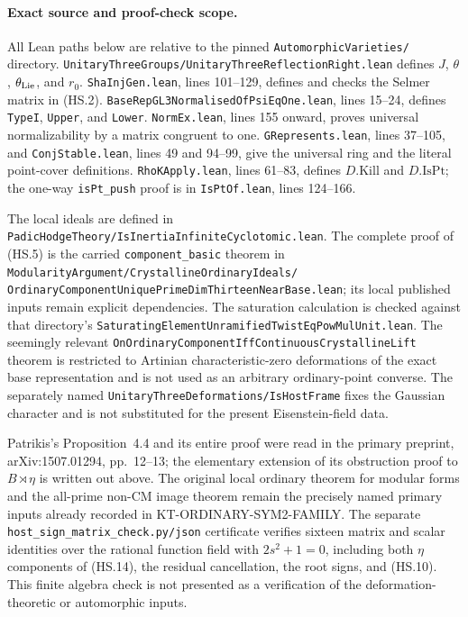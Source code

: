\paragraph{Exact source and proof-check scope.}
All Lean paths below are relative to the pinned
\texttt{AutomorphicVarieties/} directory.
\texttt{UnitaryThreeGroups/UnitaryThreeReflectionRight.lean}
defines $J$, $\theta$, $\theta_{\rm Lie}$, and $r_0$.
\texttt{ShaInjGen.lean}, lines 101--129, defines and checks
the Selmer matrix in (HS.2).
\texttt{BaseRepGL3NormalisedOfPsiEqOne.lean}, lines 15--24,
defines \texttt{TypeI}, \texttt{Upper}, and \texttt{Lower}.
\texttt{NormEx.lean}, lines 155 onward, proves universal
normalizability by a matrix congruent to one.
\texttt{GRepresents.lean}, lines 37--105, and
\texttt{ConjStable.lean}, lines 49 and 94--99, give the
universal ring and the literal point-cover definitions.
\texttt{RhoKApply.lean}, lines 61--83, defines
$D.\mathrm{Kill}$ and $D.\mathrm{IsPt}$; the one-way
\texttt{isPt\_push} proof is in \texttt{IsPtOf.lean},
lines 124--166.

The local ideals are defined in
\texttt{PadicHodgeTheory/IsInertiaInfiniteCyclotomic.lean}.
The complete proof of (HS.5) is the carried
\texttt{component\_basic} theorem in
\texttt{ModularityArgument/CrystallineOrdinaryIdeals/}
\texttt{OrdinaryComponentUniquePrimeDimThirteenNearBase.lean};
its local published inputs remain explicit dependencies.
The saturation calculation is checked against that
directory's \texttt{SaturatingElementUnramifiedTwistEqPowMulUnit.lean}.
The seemingly relevant \texttt{OnOrdinaryComponentIffContinuousCrystallineLift}
theorem is restricted to Artinian characteristic-zero
deformations of the exact base representation and is not
used as an arbitrary ordinary-point converse.
The separately named \texttt{UnitaryThreeDeformations/IsHostFrame}
fixes the Gaussian character and is not substituted for
the present Eisenstein-field data.

Patrikis's Proposition~4.4 and its entire proof were read
in the primary preprint, arXiv:1507.01294, pp.~12--13;
the elementary extension of its obstruction proof to
$B\rtimes\eta$ is written out above.  The original local
ordinary theorem for modular forms and the all-prime
non-CM image theorem remain the precisely named primary
inputs already recorded in KT-ORDINARY-SYM2-FAMILY.
The separate \texttt{host\_sign\_matrix\_check.py/json}
certificate verifies sixteen matrix and scalar identities
over the rational function field with $2s^2+1=0$, including
both $\eta$ components of (HS.14), the residual cancellation,
the root signs, and (HS.10).  This finite algebra check is
not presented as a verification of the deformation-theoretic
or automorphic inputs.
